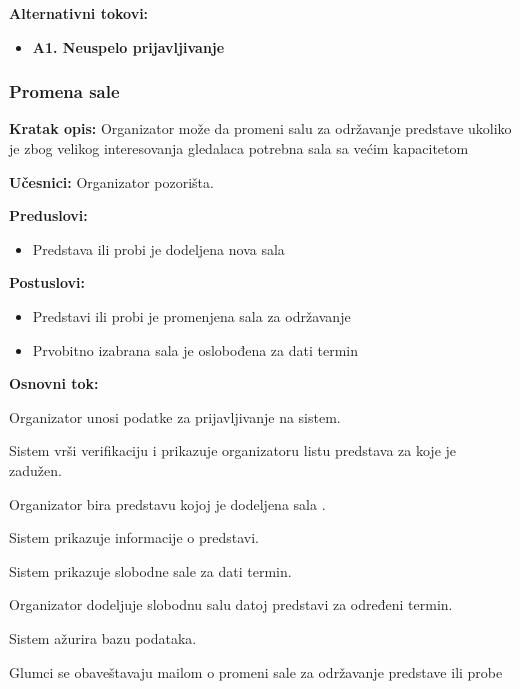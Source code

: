 \documentclass[a4paper]{article}
\begin{document}
\noindent\textbf{Alternativni tokovi:} 
\begin{itemize}
 \item \textbf{A1. Neuspelo prijavljivanje} 
  
\end{itemize}


\subsubsection{Promena sale}
\noindent\textbf{Kratak opis:} Organizator može da promeni salu za održavanje predstave ukoliko je zbog velikog interesovanja gledalaca potrebna sala sa većim kapacitetom

\noindent\textbf{Učesnici:} Organizator pozorišta.

\noindent\textbf{Preduslovi:}
  \begin{itemize}
    \item Predstava ili probi je dodeljena nova sala
  \end{itemize}

\noindent\textbf{Postuslovi:} 
  \begin{itemize}
    \item Predstavi ili probi je promenjena  sala za održavanje
    \item Prvobitno izabrana sala je oslobođena za dati termin
  \end{itemize}

\noindent\textbf{Osnovni tok:}
  \begin{legal}
  \item Organizator unosi podatke za prijavljivanje na sistem.
    \item Sistem vrši verifikaciju i prikazuje organizatoru listu predstava za koje je zadužen.
    \item Organizator bira predstavu kojoj je dodeljena sala .
    \item Sistem prikazuje informacije o predstavi.
    \item Sistem prikazuje slobodne sale za dati termin.
    \item Organizator dodeljuje slobodnu salu datoj predstavi za određeni termin.
     \item Sistem ažurira bazu podataka.
    \item Glumci se obaveštavaju mailom o promeni sale za održavanje predstave ili probe
  \end{legal}
\end{document}
